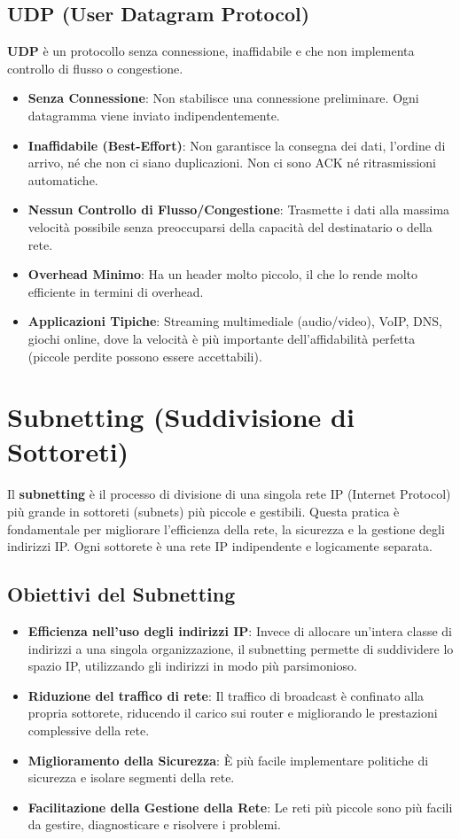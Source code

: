\subsection{UDP (User Datagram Protocol)}
\textbf{UDP} è un protocollo senza connessione, inaffidabile e che non implementa controllo di flusso o congestione.
\begin{itemize}
    \item \textbf{Senza Connessione}: Non stabilisce una connessione preliminare. Ogni datagramma viene inviato indipendentemente.
    \item \textbf{Inaffidabile (Best-Effort)}: Non garantisce la consegna dei dati, l'ordine di arrivo, né che non ci siano duplicazioni. Non ci sono ACK né ritrasmissioni automatiche.
    \item \textbf{Nessun Controllo di Flusso/Congestione}: Trasmette i dati alla massima velocità possibile senza preoccuparsi della capacità del destinatario o della rete.
    \item \textbf{Overhead Minimo}: Ha un header molto piccolo, il che lo rende molto efficiente in termini di overhead.
    \item \textbf{Applicazioni Tipiche}: Streaming multimediale (audio/video), VoIP, DNS, giochi online, dove la velocità è più importante dell'affidabilità perfetta (piccole perdite possono essere accettabili).
\end{itemize}

\section{Subnetting (Suddivisione di Sottoreti)}
Il \textbf{subnetting} è il processo di divisione di una singola rete IP (Internet Protocol) più grande in sottoreti (subnets) più piccole e gestibili. Questa pratica è fondamentale per migliorare l'efficienza della rete, la sicurezza e la gestione degli indirizzi IP. Ogni sottorete è una rete IP indipendente e logicamente separata.

\subsection{Obiettivi del Subnetting}
\begin{itemize}
    \item \textbf{Efficienza nell'uso degli indirizzi IP}: Invece di allocare un'intera classe di indirizzi a una singola organizzazione, il subnetting permette di suddividere lo spazio IP, utilizzando gli indirizzi in modo più parsimonioso.
    \item \textbf{Riduzione del traffico di rete}: Il traffico di broadcast è confinato alla propria sottorete, riducendo il carico sui router e migliorando le prestazioni complessive della rete.
    \item \textbf{Miglioramento della Sicurezza}: È più facile implementare politiche di sicurezza e isolare segmenti della rete.
    \item \textbf{Facilitazione della Gestione della Rete}: Le reti più piccole sono più facili da gestire, diagnosticare e risolvere i problemi.
\end{itemize}

